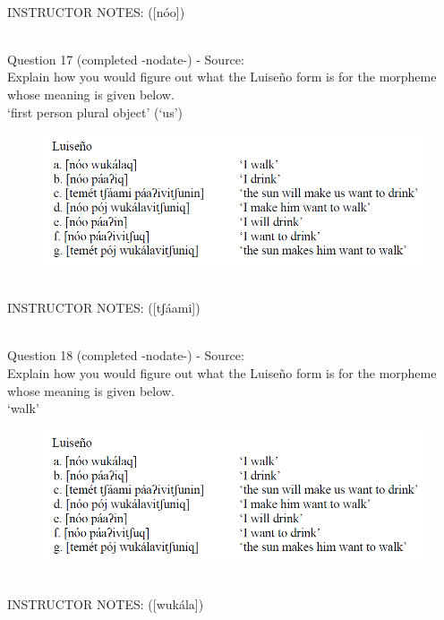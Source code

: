 \documentclass[12pt]{article}
\begin{document}
~\\
INSTRUCTOR NOTES: ([nóo])


~\\

{\large Question 17} (completed -nodate-) - Source: \\

Explain how you would figure out what the Luiseño form is for the morpheme whose meaning is given below.\\

‘first person plural object’ (‘us’)

\begin{figure}[H]
\includegraphics{../images/luiseno.png}
\end{figure}

~\\
INSTRUCTOR NOTES: ([tʃáami])


~\\

{\large Question 18} (completed -nodate-) - Source: \\

Explain how you would figure out what the Luiseño form is for the morpheme whose meaning is given below.\\

‘walk’

\begin{figure}[H]
\includegraphics{../images/luiseno.png}
\end{figure}

~\\
INSTRUCTOR NOTES: ([wukála])
\end{document}
